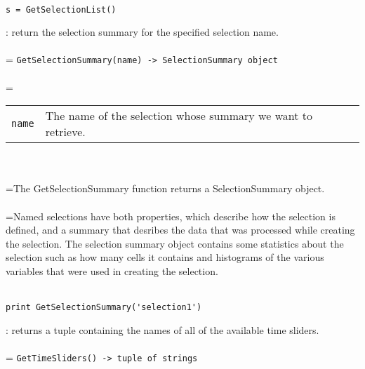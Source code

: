 \documentclass[10pt,a4paper]{report}
\begin{document}
\\[-6mm]
\begin{verbatim}s = GetSelectionList()
\end{verbatim}
\newpage


{}
: return the selection summary for the specified selection name.\\[-3mm]

 \\ 
\hangindent=\parindent 
\verb!GetSelectionSummary(name) -> SelectionSummary object!\\ [-3mm]

 \\ 
\hangindent=\parindent 
\begin{tabular}{lp{9cm}}
\verb!name! & The name of the selection whose summary we want to retrieve. \\
\end{tabular} \\[-2mm]


 \\ 
\hangindent=\parindent The GetSelectionSummary function returns a SelectionSummary object. \\[-3mm] 

 \\ 
\hangindent=\parindent Named selections have both properties, which describe how the selection is defined, and a summary that desribes the data that was processed while creating the selection. The selection summary object contains some statistics about the selection such as how many cells it contains and histograms of the various variables that were used in creating the selection. \\[-3mm] 

\\[-6mm]
\begin{verbatim}print GetSelectionSummary('selection1')
\end{verbatim}
\newpage


{}
: returns a tuple containing the names of all of the available time sliders.\\[-3mm]

 \\ 
\hangindent=\parindent 
\verb!GetTimeSliders() -> tuple of strings!\\ [-3mm]
\end{document}
